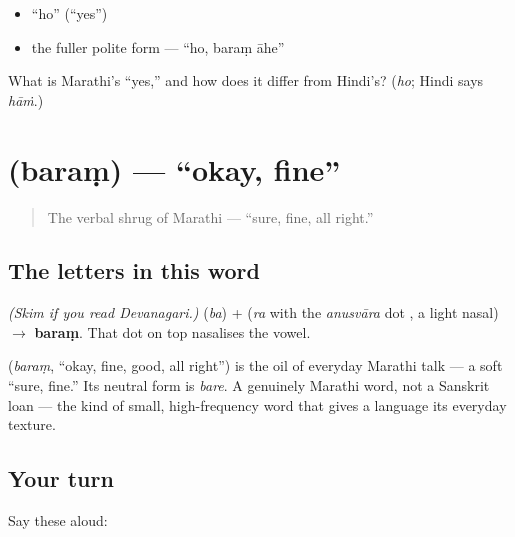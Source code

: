 \begin{itemize}
\raggedright
  \item \textquotedblleft{}ho\textquotedblright{} (\textquotedblleft{}yes\textquotedblright{})
  \item the fuller polite form — \textquotedblleft{}ho, baraṃ āhe\textquotedblright{}
\end{itemize}

\begin{tcolorbox}[breakable,colback=teal!4,colframe=teal!35!black,title={Before you move on}]
What is Marathi's \textquotedblleft{}yes,\textquotedblright{} and how does it differ from Hindi's? (\emph{ho}; Hindi says \emph{hāṁ}.)
\end{tcolorbox}
\section[baram]{ (baraṃ) — \textquotedblleft{}okay, fine\textquotedblright{}}

\label{lesson:MR-C01-baram}



\begin{quote}
The verbal shrug of Marathi — \textquotedblleft{}sure, fine, all right.\textquotedblright{}
\end{quote}

\subsection*{The letters in this word}
\emph{(Skim if you read Devanagari.)} \textbf{} (\emph{ba}) + \textbf{} (\emph{ra} with the \emph{anusvāra} dot \textbf{}, a light nasal) $\to$ \textbf{baraṃ}. That dot on top nasalises the vowel.

\begin{cousinweb}
\textbf{} (\emph{baraṃ}, \textquotedblleft{}okay, fine, good, all right\textquotedblright{}) is the oil of everyday Marathi talk — a soft \textquotedblleft{}sure, fine.\textquotedblright{} Its neutral form is \emph{bare}. A genuinely Marathi word, not a Sanskrit loan — the kind of small, high-frequency word that gives a language its everyday texture.
\end{cousinweb}

\subsection*{Your turn}
Say these aloud:

